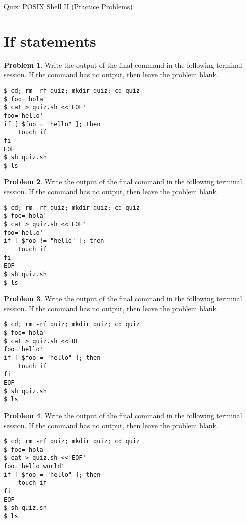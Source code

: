 \documentclass[10pt]{article}
\theoremstyle{definition}
\newtheorem{problem}{Problem}
\begin{document}
\begin{center}
    {
\Large
    Quiz: POSIX Shell II (Practice Problems)
}

    \vspace{0.1in}
\end{center}

\section{If statements}

\filbreak
\begin{problem}
    Write the output of the final command in the following terminal session.
    If the command has no output, then leave the problem blank.
\end{problem}
\begin{lstlisting}
$ cd; rm -rf quiz; mkdir quiz; cd quiz
$ foo='hola'
$ cat > quiz.sh <<'EOF'
foo='hello'
if [ $foo = "hello" ]; then
    touch if
fi
EOF
$ sh quiz.sh
$ ls
\end{lstlisting}


\filbreak
\begin{problem}
    Write the output of the final command in the following terminal session.
    If the command has no output, then leave the problem blank.
\end{problem}
\begin{lstlisting}
$ cd; rm -rf quiz; mkdir quiz; cd quiz
$ foo='hola'
$ cat > quiz.sh <<'EOF'
foo='hello'
if [ $foo != "hello" ]; then
    touch if
fi
EOF
$ sh quiz.sh
$ ls
\end{lstlisting}

\filbreak
\begin{problem}
    Write the output of the final command in the following terminal session.
    If the command has no output, then leave the problem blank.
\end{problem}
\begin{lstlisting}
$ cd; rm -rf quiz; mkdir quiz; cd quiz
$ foo='hola'
$ cat > quiz.sh <<EOF
foo='hello'
if [ $foo = "hello" ]; then
    touch if
fi
EOF
$ sh quiz.sh
$ ls
\end{lstlisting}


\filbreak
\begin{problem}
    Write the output of the final command in the following terminal session.
    If the command has no output, then leave the problem blank.
\end{problem}
\begin{lstlisting}
$ cd; rm -rf quiz; mkdir quiz; cd quiz
$ foo='hola'
$ cat > quiz.sh <<'EOF'
foo='hello world'
if [ $foo = "hello" ]; then
    touch if
fi
EOF
$ sh quiz.sh
$ ls
\end{lstlisting}
\end{document}
